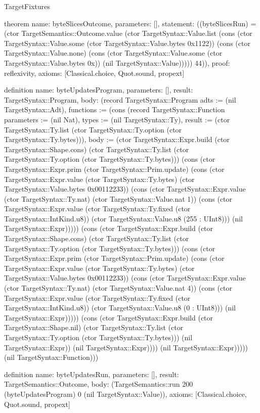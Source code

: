 \begin{lexlean}{TargetFixtures}
\begin{semanticmodule}
theorem{
  name: byteSlicesOutcome,
  parameters: [],
  statement: ((byteSlicesRun) = (ctor TargetSemantics::Outcome.value (ctor TargetSyntax::Value.list (cons (ctor TargetSyntax::Value.some (ctor TargetSyntax::Value.bytes 0x1122)) (cons (ctor TargetSyntax::Value.none) (cons (ctor TargetSyntax::Value.some (ctor TargetSyntax::Value.bytes 0x)) (nil TargetSyntax::Value))))) 44)),
  proof: reflexivity{},
  axioms: [Classical.choice, Quot.sound, propext]
}

definition{
  name: byteUpdatesProgram,
  parameters: [],
  result: TargetSyntax::Program,
  body: (record TargetSyntax::Program {adts := (nil TargetSyntax::Adt), functions := (cons (record TargetSyntax::Function {parameters := (nil Nat), types := (nil TargetSyntax::Ty), result := (ctor TargetSyntax::Ty.list (ctor TargetSyntax::Ty.option (ctor TargetSyntax::Ty.bytes))), body := (ctor TargetSyntax::Expr.build (ctor TargetSyntax::Shape.cons) (ctor TargetSyntax::Ty.list (ctor TargetSyntax::Ty.option (ctor TargetSyntax::Ty.bytes))) (cons (ctor TargetSyntax::Expr.prim (ctor TargetSyntax::Prim.update) (cons (ctor TargetSyntax::Expr.value (ctor TargetSyntax::Ty.bytes) (ctor TargetSyntax::Value.bytes 0x00112233)) (cons (ctor TargetSyntax::Expr.value (ctor TargetSyntax::Ty.nat) (ctor TargetSyntax::Value.nat 1)) (cons (ctor TargetSyntax::Expr.value (ctor TargetSyntax::Ty.fixed (ctor TargetSyntax::IntKind.u8)) (ctor TargetSyntax::Value.u8 (255 : UInt8))) (nil TargetSyntax::Expr))))) (cons (ctor TargetSyntax::Expr.build (ctor TargetSyntax::Shape.cons) (ctor TargetSyntax::Ty.list (ctor TargetSyntax::Ty.option (ctor TargetSyntax::Ty.bytes))) (cons (ctor TargetSyntax::Expr.prim (ctor TargetSyntax::Prim.update) (cons (ctor TargetSyntax::Expr.value (ctor TargetSyntax::Ty.bytes) (ctor TargetSyntax::Value.bytes 0x00112233)) (cons (ctor TargetSyntax::Expr.value (ctor TargetSyntax::Ty.nat) (ctor TargetSyntax::Value.nat 4)) (cons (ctor TargetSyntax::Expr.value (ctor TargetSyntax::Ty.fixed (ctor TargetSyntax::IntKind.u8)) (ctor TargetSyntax::Value.u8 (0 : UInt8))) (nil TargetSyntax::Expr))))) (cons (ctor TargetSyntax::Expr.build (ctor TargetSyntax::Shape.nil) (ctor TargetSyntax::Ty.list (ctor TargetSyntax::Ty.option (ctor TargetSyntax::Ty.bytes))) (nil TargetSyntax::Expr)) (nil TargetSyntax::Expr)))) (nil TargetSyntax::Expr))))}) (nil TargetSyntax::Function))})
}

definition{
  name: byteUpdatesRun,
  parameters: [],
  result: TargetSemantics::Outcome,
  body: (TargetSemantics::run 200 (byteUpdatesProgram) 0 (nil TargetSyntax::Value)),
  axioms: [Classical.choice, Quot.sound, propext]
}


\end{semanticmodule}
\end{lexlean}
